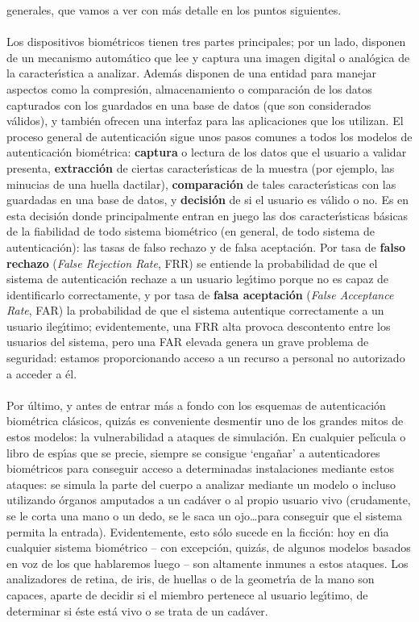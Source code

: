 generales, que vamos a ver con m\'as detalle en los puntos siguientes.\\
\\Los dispositivos biom\'etricos tienen tres partes principales; por un lado,
disponen de un mecanismo autom\'atico que lee y captura una imagen digital o
anal\'ogica de la caracter\'{\i}stica a analizar. Adem\'as disponen de una 
entidad para manejar aspectos como la compresi\'on, almacenamiento o 
comparaci\'on de los datos capturados con los guardados en una base de datos
(que son considerados v\'alidos), y tambi\'en ofrecen una interfaz para las
aplicaciones que los utilizan. El proceso general de autenticaci\'on sigue unos
pasos comunes a todos los modelos de autenticaci\'on biom\'etrica: {\bf 
captura} o lectura de los datos que el usuario a validar presenta, {\bf 
extracci\'on} de ciertas caracter\'{\i}sticas de la muestra (por ejemplo, las
minucias de una huella dactilar), {\bf comparaci\'on} de tales 
caracter\'{\i}sticas con las guardadas en una base de datos, y {\bf decisi\'on}
de si el usuario es v\'alido o no. Es en esta decisi\'on donde principalmente
entran en juego las dos caracter\'{\i}sticas b\'asicas de la fiabilidad de todo
sistema biom\'etrico (en general, de todo sistema de autenticaci\'on): las 
tasas de falso rechazo y de falsa aceptaci\'on. Por tasa de {\bf falso rechazo} 
({\it False Rejection Rate}, FRR) se entiende la probabilidad de que el sistema
de autenticaci\'on rechaze a un usuario leg\'{\i}timo porque no es capaz de
identificarlo correctamente, y por tasa de {\bf falsa aceptaci\'on} ({\it False
Acceptance Rate}, FAR) la probabilidad de que el sistema autentique 
correctamente a un usuario ileg\'{\i}timo; evidentemente, una FRR alta provoca
descontento entre los usuarios del sistema, pero una FAR elevada genera un 
grave problema de seguridad: estamos proporcionando acceso a un recurso a 
personal no autorizado a acceder a \'el.\\
\\Por \'ultimo, y antes de entrar m\'as a fondo con los esquemas de 
autenticaci\'on biom\'etrica cl\'asicos, quiz\'as es conveniente desmentir uno
de los grandes mitos de estos modelos: la vulnerabilidad a ataques de 
simulaci\'on. En cualquier pel\'{\i}cula o libro de esp\'{\i}as que se precie, 
siempre se consigue `enga\~nar' a autenticadores biom\'etricos para conseguir 
acceso a determinadas instalaciones mediante estos ataques: se simula la parte 
del cuerpo a analizar mediante un modelo o incluso utilizando \'organos 
amputados a un cad\'aver o al propio usuario vivo (crudamente, se le corta una 
mano o un dedo, se le saca un ojo\ldots para conseguir que el sistema permita 
la entrada). Evidentemente, esto s\'olo sucede en la ficci\'on: hoy en d\'{\i}a 
cualquier sistema
biom\'etrico -- con excepci\'on, quiz\'as, de algunos modelos basados en voz
de los que hablaremos luego -- son altamente inmunes a estos ataques. Los 
analizadores de retina, de iris, de huellas o de la geometr\'{\i}a de la mano
son capaces, aparte de decidir si el miembro pertenece al usuario leg\'{\i}timo,
de determinar si \'este est\'a vivo o se trata de un cad\'aver.
